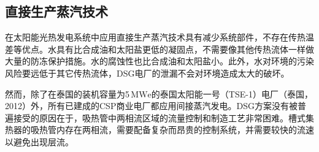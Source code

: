 \subsection{直接生产蒸汽技术}
在太阳能光热发电系统中应用直接生产蒸汽技术具有减少系统部件，不存在传热温差等优点。水具有比合成油和太阳盐更低的凝固点，不需要像其他传热流体一样做大量的防冻保护措施。水的腐蚀性也比合成油和太阳盐小\cite{Giglio2017}。此外，水对环境的污染风险要远低于其它传热流体，DSG电厂的泄漏不会对环境造成太大的破坏\cite{Fernandez2010}。

然而，除了在泰国的装机容量为5$\,\mathrm{MWe}$的泰国太阳能一号（TSE-1）电厂（泰国，2012）外，所有已建成的CSP商业电厂都应用间接蒸汽发电\cite{Khenissi2015}。DSG方案没有被普遍接受的原因在于，吸热管中两相流区域的流量控制和制造工艺非常困难。槽式集热器的吸热管内存在两相流，需要配备复杂而昂贵的控制系统，并需要较快的流速以避免出现层流。

